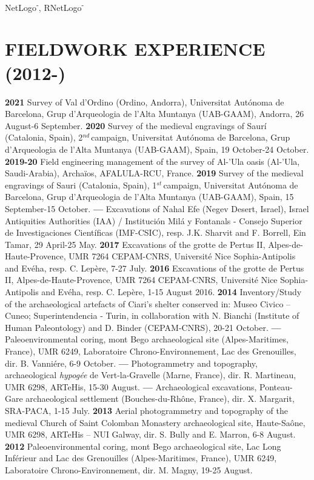 \documentclass{article}
\begin{document}
NetLogo\textsuperscript{-}, \textsf{RNetLogo\textsuperscript{-}}


\section{FIELDWORK EXPERIENCE (2012-)}

\textbf{2021 }Survey of Val d'Ordino (Ordino, Andorra), Universitat Aut\'{o}noma de Barcelona, Grup d'Arqueologia de l'Alta Muntanya (UAB-GAAM), Andorra, 26 August-6 September.
\smallbreak
\textbf{2020 }Survey of the medieval engravings of Saur\'i (Catalonia, Spain), 2${}^{nd\ }$campaign, Universitat Aut\'{o}noma de Barcelona, Grup d'Arqueologia de l'Alta Muntanya (UAB-GAAM), Spain, 19 October-24 October.
\smallbreak
\textbf{2019-20 }Field engineering management of the survey of Al-'Ula oasis (Al-'Ula, Saudi-Arabia), Archa\"{i}os, AFALULA-RCU, France.
\smallbreak
\textbf{2019 }Survey of the medieval engravings of Sauri (Catalonia, Spain), 1${}^{st\ }$campaign, Universitat Aut\'{o}noma de Barcelona, Grup d'Arqueologia de l'Alta Muntanya (UAB-GAAM), Spain, 15 September-15 October.
\smallbreak
\textbf{--- }Excavations of Nahal Efe (Negev Desert, Israel), Israel Antiquities Authorities (IAA) / Instituci\'{o}n Mil\'{a} y Fontanals - Consejo Superior de Investigaciones Cient\'{i}ficas (IMF-CSIC), resp. J.K. Sharvit and F. Borrell, Ein Tamar, 29 April-25 May.
\smallbreak
\textbf{2017 }Excavations of the grotte de Pertus II, Alpes-de-Haute-Provence, UMR 7264 CEPAM-CNRS, Universit\'{e} Nice Sophia-Antipolis and Ev\'{e}ha, resp. C. Lep\`{e}re, 7-27 July.
\smallbreak
\textbf{2016 }Excavations of the grotte de Pertus II, Alpes-de-Haute-Provence, UMR 7264 CEPAM-CNRS, Universit\'{e} Nice Sophia-Antipolis and Ev\'{e}ha, resp. C. Lep\`{e}re, 1-15 August 2016.
\smallbreak
\textbf{2014 }Inventory/Study of the archaeological artefacts of Ciari's shelter conserved in: Museo Civico -- Cuneo; Superintendencia - Turin, in collaboration with N. Bianchi (Institute of Human Paleontology) and D. Binder (CEPAM-CNRS), 20-21 October.
\smallbreak
\textbf{--- }Paleoenvironmental coring, mont Bego archaeological site (Alpes-Maritimes, France), UMR 6249, Laboratoire Chrono-Environnement, Lac des Grenouilles, dir. B. Vanni\'{e}re, 6-9 October.
\smallbreak
\textbf{--- }Photogrammetry and topography, archaeological \textit{hypog\'{e}e} de Vert-la-Gravelle (Marne, France), dir. R. Martineau, UMR 6298, ARTeHis, 15-30 August.
\smallbreak
\textbf{--- }Archaeological excavations, Ponteau-Gare archaeological settlement (Bouches-du-Rh\^{o}ne, France), dir. X. Margarit, SRA-PACA, 1-15 July.\smallbreak
\textbf{2013 }Aerial\textbf{ }photogrammetry and topography of the medieval Church of Saint Colomban Monastery archaeological site, Haute-Sa\^{o}ne, UMR 6298, ARTeHis -- NUI Galway, dir. S. Bully and E. Marron, 6-8 August.
\smallbreak
\textbf{2012 }Paleoenvironmental coring, mont Bego archaeological site, Lac Long Inf\'{e}rieur and Lac des Grenouilles (Alpes-Maritimes, France), UMR 6249, Laboratoire Chrono-Environnement, dir. M. Magny, 19-25 August.
\end{document}
